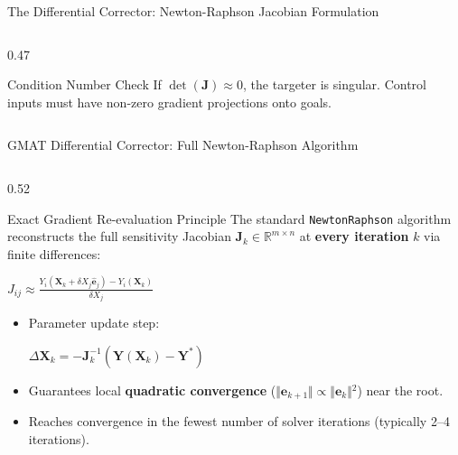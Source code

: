 \documentclass[aspectratio=169, 10pt]{beamer}
\begin{document}
\begin{frame}{The Differential Corrector: Newton-Raphson Jacobian Formulation}
\begin{columns}[t]
\begin{column}{0.47\textwidth}
            \vspace{-0.1cm}

            \begin{alertblock}{Condition Number Check}
                \scriptsize If $\det(\mathbf{J}) \approx 0$, the targeter is singular. Control inputs must have non-zero gradient projections onto goals.
            \end{alertblock}
        \end{column}
    \end{columns}
\end{frame}

\begin{frame}{GMAT Differential Corrector: Full Newton-Raphson Algorithm}
    \begin{columns}[t]
        \begin{column}{0.52\textwidth}
            \begin{block}{Exact Gradient Re-evaluation Principle}
                \scriptsize
                The standard \texttt{NewtonRaphson} algorithm reconstructs the full sensitivity Jacobian $\mathbf{J}_k \in \mathbb{R}^{m \times n}$ at \textbf{every iteration} $k$ via finite differences:
                \par\vspace{2pt}
                {\centering $\displaystyle J_{ij} \approx \frac{Y_i(\mathbf{X}_k + \delta X_j \hat{\mathbf{e}}_j) - Y_i(\mathbf{X}_k)}{\delta X_j}$\par}
                \vspace{2pt}
                \begin{itemize}\setlength{\itemsep}{1.2pt}\setlength{\topsep}{0pt}
                    \item Parameter update step:
                    \par\vspace{1pt}
                    {\centering $\displaystyle \Delta \mathbf{X}_k = -\mathbf{J}_k^{-1} \left(\mathbf{Y}(\mathbf{X}_k) - \mathbf{Y}^*\right)$\par}
                    \item Guarantees local \textbf{quadratic convergence} ($\Vert{}\mathbf{e}_{k+1}\Vert{} \propto \Vert{}\mathbf{e}_k\Vert{}^2$) near the root.
                    \item Reaches convergence in the fewest number of solver iterations (typically 2--4 iterations).
                \end{itemize}
            \end{block}


\end{column}
\end{columns}
\end{frame}
\end{document}
